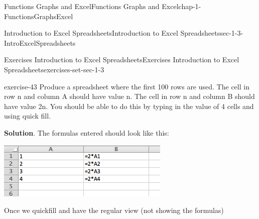 \documentclass[oneside,10pt,]{book}
\numberwithin{equation}{section}
\begin{document}
\begin{chapterptx}{Functions Graphs and Excel}{}{Functions Graphs and Excel}{}{}{chap-1-FunctionsGraphsExcel}
\begin{sectionptx}{Introduction to Excel Spreadsheets}{}{Introduction to Excel Spreadsheets}{}{}{sec-1-3-IntroExcelSpreadsheets}
%
\begin{exercises-subsection-numberless}{Exercises Introduction to Excel Spreadsheets}{}{Exercises Introduction to Excel Spreadsheets}{}{}{exercises-set-sec-1-3}
\begin{divisionexercise}{1}{}{}{exercise-43}%
\hypertarget{p-279}{}%
Produce a spreadsheet where the first 100 rows are used.  The cell in row n and column A should have value n.  The cell in row n and column B should have value 2\textasteriskcentered{}n.  You should be able to do this by typing in the value of 4 cells and using quick fill.%
\par\smallskip%
\noindent\textbf{Solution}.\hypertarget{solution-22}{}\quad%
\hypertarget{p-280}{}%
The formulas entered should look like this:%
\begin{sidebyside}{1}{0.1}{0.1}{0}%
\begin{sbspanel}{0.8}%
\includegraphics[width=1\linewidth]{images/sec1-3-sol1a.png}
\end{sbspanel}%
\end{sidebyside}%
\par
\hypertarget{p-281}{}%
Once we quickfill and have the regular view (not showing the formulas)%
\begin{sidebyside}{1}{0.25}{0.25}{0}%
\begin{sbspanel}{0.5}%

\end{sbspanel}
\end{sidebyside}
\end{divisionexercise}
\end{exercises-subsection-numberless}
\end{sectionptx}
\end{chapterptx}
\end{document}
